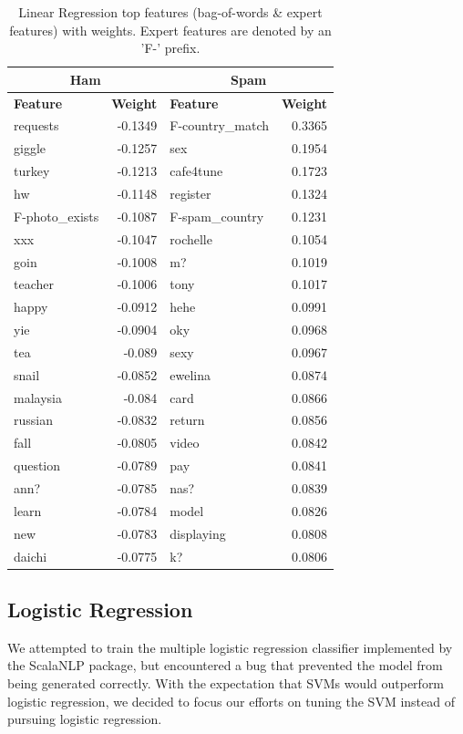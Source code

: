 \documentclass[preprint]{acm_proc_article-sp}
\begin{document}
\begin{table}
\begin{tabular}{l|r||l|r}
\multicolumn{2}{c}{\textbf{Ham}} & 
\multicolumn{2}{c}{\textbf{Spam}} \\
\hline
\textbf{Feature} & \textbf{Weight} & \textbf{Feature} & \textbf{Weight} \\
\hline

requests & -0.1349 & F-country\_match & 0.3365\\
giggle & -0.1257 & sex & 0.1954\\
turkey & -0.1213 & cafe4tune & 0.1723\\
hw & -0.1148 & register & 0.1324\\
F-photo\_exists & -0.1087 & F-spam\_country & 0.1231\\
xxx & -0.1047 & rochelle & 0.1054\\
goin & -0.1008 & m? & 0.1019\\
teacher & -0.1006 & tony & 0.1017\\
happy & -0.0912 & hehe & 0.0991\\
yie & -0.0904 & oky & 0.0968\\
tea & -0.089 & sexy & 0.0967\\
snail & -0.0852 & ewelina & 0.0874\\
malaysia & -0.084 & card & 0.0866\\
russian & -0.0832 & return & 0.0856\\
fall & -0.0805 & video & 0.0842\\
question & -0.0789 & pay & 0.0841\\
ann? & -0.0785 & nas? & 0.0839\\
learn & -0.0784 & model & 0.0826\\
new & -0.0783 & displaying & 0.0808\\
daichi & -0.0775 & k?  & 0.0806\\

\end{tabular}
\caption{Linear Regression top features (bag-of-words \& expert features) with weights. Expert features
are denoted by an 'F-' prefix.}
\label{tab:lrfeats}
\end{table}

\subsection{Logistic Regression}

We attempted to train the multiple logistic regression classifier implemented by the ScalaNLP package, 
but encountered a bug that prevented the model from being generated correctly. With the expectation 
that SVMs would outperform logistic regression, we decided to focus our efforts on tuning the SVM 
instead of pursuing logistic regression. 
\end{document}
